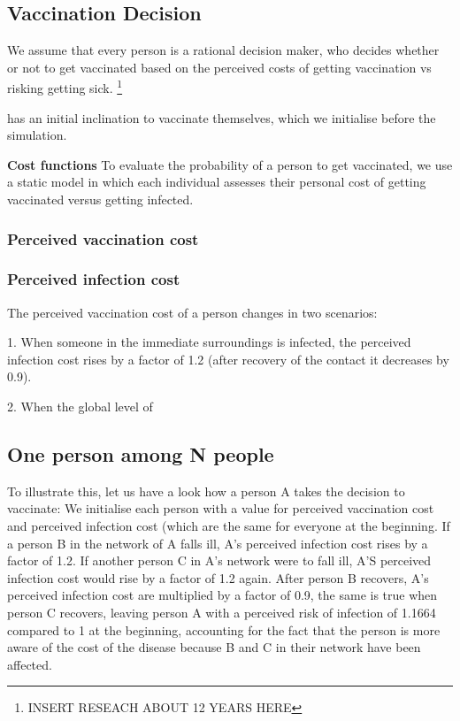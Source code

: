 \documentclass[11pt]{article}
\begin{document}
\subsection{Vaccination Decision}

We assume that every person is a rational decision maker, who decides whether or not to get vaccinated based on the perceived costs of getting vaccination vs risking getting sick.  \footnote{INSERT RESEACH ABOUT 12 YEARS HERE}  

has an initial inclination to vaccinate themselves, which we initialise before the simulation. 


\textbf{Cost functions}
To evaluate the probability of a person to get vaccinated, we use a static model in which each individual assesses their personal cost of getting vaccinated versus getting infected. 


\subsubsection{Perceived vaccination cost} 


\subsubsection{Perceived infection cost}
The perceived vaccination cost of a person changes in two scenarios:

1. When someone in the immediate surroundings is infected, the perceived infection cost rises by a factor of 1.2 (after recovery of the contact it decreases by 0.9).

2. When the global level of 

\subsection{One person among N people}
To illustrate this, let us have a look how a person A takes the decision to vaccinate: 
We initialise each person with a value for perceived vaccination cost and perceived infection cost (which are the same for everyone at the beginning. 
If a person B in the network of A falls ill, A's perceived infection cost rises by a factor of 1.2. If another person C in A's network were to fall ill, A'S perceived infection cost would rise by a factor of 1.2 again. After person B recovers, A's perceived infection cost are multiplied by a factor of 0.9, the same is true when person C recovers, leaving person A with a perceived risk of infection of 1.1664 compared to 1 at the beginning, accounting for the fact that the person is more aware of the cost of the disease because B and C in their network have been affected. 
\end{document}
